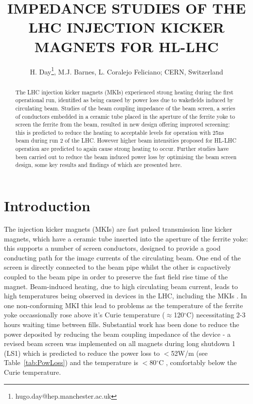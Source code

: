 \documentclass[a4paper,
              ]{jacow}
\begin{document}
\title{IMPEDANCE STUDIES OF THE LHC INJECTION KICKER MAGNETS FOR HL-LHC}
\author{H. Day\thanks{hugo.day@hep.manchester.ac.uk}, M.J. Barnes, L. Coralejo Feliciano;  CERN, Switzerland}

\maketitle 


\begin{abstract}
The LHC injection kicker magnets (MKIs) experienced strong heating during the first operational run, identified as being caused by power loss due to wakefields induced by circulating beam. Studies of the beam coupling impedance of the beam screen, a series of conductors embedded in a ceramic tube placed in the aperture of the ferrite yoke to screen the ferrite from the beam, resulted in new design offering improved screening: this is predicted to reduce the heating to acceptable levels for operation with 25ns beam during run 2 of the LHC. However higher beam intensities proposed for HL-LHC operation are predicted to again cause strong heating to occur. Further studies have been carried out to reduce the beam induced power loss by optimising the beam screen design, some key results and findings of which are presented here.
\end{abstract}

\section{Introduction}

The injection kicker magnets (MKIs) are fast pulsed transmission line kicker magnets, which have a ceramic tube inserted into the aperture of the ferrite yoke: this supports a number of screen conductors, designed to provide a good conducting path for the image currents of the circulating beam. One end of the screen is directly connected to the beam pipe whilst the other is capactively coupled to the beam pipe in order to preserve the fast field rise time of the magnet. Beam-induced heating, due to high circulating beam current, leads to high temperatures being observed in devices in the LHC, including the MKIs \cite{mki-heatingTemp}. In one non-conforming MKI this lead to problems as the temperature of the ferrite yoke occassionally rose above it's Curie temperature ($\approx$120$^{\circ}$C) necessitating 2-3 hours waiting time between fills. Substantial work has been done to reduce the power deposited by reducing the beam coupling impedance of the device - a revised beam screen was implemented on all magnets during long shutdown 1 (LS1) which is predicted to reduce the power loss to $<$52W/m (see Table~\ref{tab:PowLoss}) and the temperature is $<$80$^{\circ}$C \cite{lorenaStrat}, comfortably below the Curie temperature. 
\end{document}
